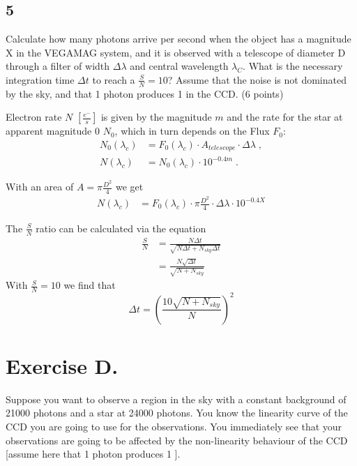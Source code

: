 \documentclass[11pt,a4paper,twoside]{article}
\newcommand{\electron}{\ce{e^-}}
\newcommand{\SNR}{\ensuremath{\frac{S}{N}} }
\begin{document}
\subsection*{5}

Calculate how many photons arrive per second when the object has a magnitude X 
in the VEGAMAG system, and it is observed with a telescope of diameter D 
through a filter of width $\Delta\lambda$ and central wavelength $\lambda_C$. 
What is the necessary integration time $\Delta t$ to reach a $\SNR=10$? 
Assume that the noise is not dominated by the sky, and that 1 photon produces 1
\electron in the CCD. (6 points)


Electron rate $N$ $[\frac{e^-}{s}]$ is given by the magnitude $m$ and the rate 
for the star at apparent magnitude 0 $N_0$, which in turn depends on the 
Flux $F_0$:
\begin{align}
    N_0(\lambda_c) &= F_0(\lambda_c) \cdot A_{telescope} \cdot \Delta\lambda \;,\\
    N(\lambda_c) &= N_0(\lambda_c) \cdot 10^{-0.4m} \;.
\end{align}

With an area of $A = \pi\frac{D^2}{4}$ we get 
\begin{align}
    N(\lambda_c)&= F_0(\lambda_c) \cdot \pi\frac{D^2}{4} 
                   \cdot \Delta\lambda \cdot10^{-0.4X}
\end{align}

The \SNR ratio can be calculated via the equation
\begin{align}
    \SNR &= \frac{N\Delta t}{\sqrt{N\Delta t + N_{sky}\Delta t}} \\
    &= \frac{N\sqrt{\Delta t}}{\sqrt{N + N_{sky}}}
\end{align}
With $\frac{S}{N}=10$ we find that 
$$ \Delta t = \left(\frac{10\sqrt{N + N_{sky}}}{N}\right)^2 $$

\section*{Exercise D.}

Suppose you want to observe a region in the sky with a constant background of \num{21000} photons and a star at \num{24000} photons. You know the linearity curve of the CCD you are going to use for the observations. You immediately see that your observations are going to be affected by the non-linearity behaviour of the CCD [assume here that \num{1} photon produces \num{1} \electron].
\end{document}
